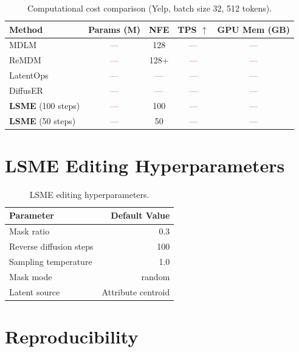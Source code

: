 \documentclass{article}
\newcommand{\tbd}[1]{\textcolor{red}{#1}}  %
\begin{document}
\begin{table}[h]
\centering
\caption{Computational cost comparison (Yelp, batch size 32, 512 tokens).}
\label{tab:efficiency}
\small
\begin{tabular}{lcccc}
\toprule
\textbf{Method} & \textbf{Params (M)} & \textbf{NFE} & \textbf{TPS} $\uparrow$ & \textbf{GPU Mem (GB)} \\
\midrule
MDLM & \tbd{---} & 128 & \tbd{---} & \tbd{---} \\
ReMDM & \tbd{---} & 128+ & \tbd{---} & \tbd{---} \\
LatentOps & \tbd{---} & \tbd{---} & \tbd{---} & \tbd{---} \\
DiffusER & \tbd{---} & \tbd{---} & \tbd{---} & \tbd{---} \\
\midrule
\textbf{LSME} (100 steps) & \tbd{---} & 100 & \tbd{---} & \tbd{---} \\
\textbf{LSME} (50 steps) & \tbd{---} & 50 & \tbd{---} & \tbd{---} \\
\bottomrule
\end{tabular}
\end{table}

\section{LSME Editing Hyperparameters}
\label{app:hyperparams}


\begin{table}[h]
\centering
\caption{LSME editing hyperparameters.}
\small
\begin{tabular}{lr}
\toprule
\textbf{Parameter} & \textbf{Default Value} \\
\midrule
Mask ratio & 0.3 \\
Reverse diffusion steps & 100 \\
Sampling temperature & 1.0 \\
Mask mode & random \\
Latent source & Attribute centroid \\
\bottomrule
\end{tabular}
\end{table}

\section{Reproducibility}
\label{app:reproducibility}

\end{document}
